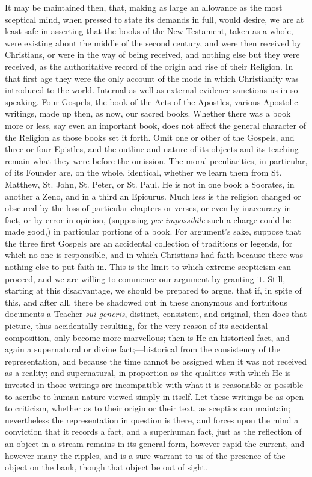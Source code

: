 It may be maintained then, that, making as large
an allowance as the most sceptical mind, when pressed to state its
demands in full, would desire, we are at least safe in asserting that
the books of the New Testament, taken as a whole, were existing about
the middle of the second century, and were then received by
Christians, or were in the way of being received, and nothing else but
they were received, as the authoritative record of the origin and rise
of their Religion. In that first age they were the only account of the
mode in which Christianity was introduced to the world. Internal as
well as external evidence sanctions us in so speaking. Four Gospels,
the book of the Acts of the Apostles, various Apostolic writings, made
up then, as now, our sacred books. Whether there was a book more or
less, say even an important book, does not affect the general
character of the Religion as those books set it forth. Omit one or
other of the Gospels, and three or four Epistles, and the outline and
nature of its objects and its teaching remain what they were before
the omission. The moral peculiarities, in particular, of its Founder
are, on the whole, identical, whether we learn them from St. Matthew,
St. John, St. Peter, or St. Paul. He is not in one book a Socrates, in
another a Zeno, and in a third an Epicurus. Much less is the religion
changed or obscured by the loss of particular chapters or verses, or
even by inaccuracy in fact, or by error in opinion, (supposing \emph{per
impossibile} such a charge could be made good,) in particular portions of a book. For argument's sake, suppose that the three first
Gospels are an accidental collection of traditions or legends, for
which no one is responsible, and in which Christians had faith because
there was nothing else to put faith in. This is the limit to which
extreme scepticism can proceed, and we are willing to commence our
argument by granting it. Still, starting at this disadvantage, we
should be prepared to argue, that if, in spite of this, and after all,
there be shadowed out in these anonymous and fortuitous documents a
Teacher \emph{sui generis}, distinct, consistent, and original, then
does that picture, thus accidentally resulting, for the very reason of
its accidental composition, only become more marvellous; then is He an
historical fact, and again a supernatural or divine fact;—historical
from the consistency of the representation, and because the time
cannot be assigned when it was not received as a reality; and
supernatural, in proportion as the qualities with which He is invested
in those writings are incompatible with what it is reasonable or
possible to ascribe to human nature viewed simply in itself. Let these
writings be as open to criticism, whether as to their origin or their
text, as sceptics can maintain; nevertheless the representation in
question is there, and forces upon the mind a conviction that it
records a fact, and a superhuman fact, just as the reflection of an
object in a stream remains in its general form, however rapid the
current, and however many the ripples, and is a sure warrant to us of
the presence of the object on the bank, though that object be out of
sight.

